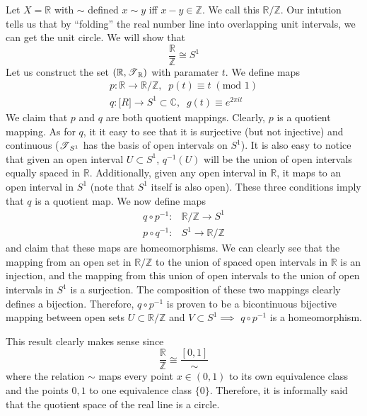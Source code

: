   \begin{example}
    Let $X = \mathbb{R}$ with $\sim$ defined $x \sim y$ iff $x - y \in \mathbb{Z}$. We call this $\mathbb{R}/\mathbb{Z}$. Our intution tells us that by ``folding'' the real number line into overlapping unit intervals, we can get the unit circle. We will show that
    \begin{equation}
      \frac{\mathbb{R}}{\mathbb{Z}} \cong S^1
    \end{equation}
    Let us construct the set $(\mathbb{R}, \operatorname{\mathscr{T}}_{\mathbb{R}})$ with paramater $t$. We define maps
    \begin{align*}
      p: \mathbb{R} \rightarrow \mathbb{R} / \mathbb{Z}, \;\; p(t) \equiv t \; (\text{mod } 1) \\
      q: \mathbb[R] \rightarrow S^1 \subset \mathbb{C}, \;\; g(t) \equiv e^{2 \pi i t} 
    \end{align*}
    We claim that $p$ and $q$ are both quotient mappings. Clearly, $p$ is a quotient mapping. As for $q$, it it easy to see that it is surjective (but not injective) and continuous ($\operatorname{\mathscr{T}}_{S^1}$ has the basis of open intervals on $S^1$). It is also easy to notice that given an open interval $U \subset S^1$, $q^{-1}(U)$ will be the union of open intervals equally spaced in $\mathbb{R}$. Additionally, given any open interval in $\mathbb{R}$, it maps to an open interval in $S^1$ (note that $S^1$ itself is also open). These three conditions imply that $q$ is a quotient map. We now define maps 
    \begin{align}
      q \circ p^{-1}: & \mathbb{R} / \mathbb{Z} \rightarrow S^1 \\
      p \circ q^{-1}: & S^1 \rightarrow \mathbb{R} / \mathbb{Z}
    \end{align}
    and claim that these maps are homeomorphisms. We can clearly see that the mapping from an open set in $\mathbb{R} / \mathbb{Z}$ to the union of spaced open intervals in $\mathbb{R}$ is an injection, and the mapping from this union of open intervals to the union of open intervals in $S^1$ is a surjection. The composition of these two mappings clearly defines a bijection. Therefore, $q \circ p^{-1}$ is proven to be a bicontinuous bijective mapping between open sets $U \subset \mathbb{R} / \mathbb{Z}$ and $V \subset S^1 \implies$ $q \circ p^{-1}$ is a homeomorphism. 

    This result clearly makes sense since 
    \begin{equation}
      \frac{\mathbb{R}}{\mathbb{Z}} \cong \frac{[0,1]}{\sim}
    \end{equation}
    where the relation $\sim$ maps every point $x \in (0,1)$ to its own equivalence class and the points $0, 1$ to one equivalence class $\{0\}$. Therefore, it is informally said that the quotient space of the real line is a circle. 


\end{example}

